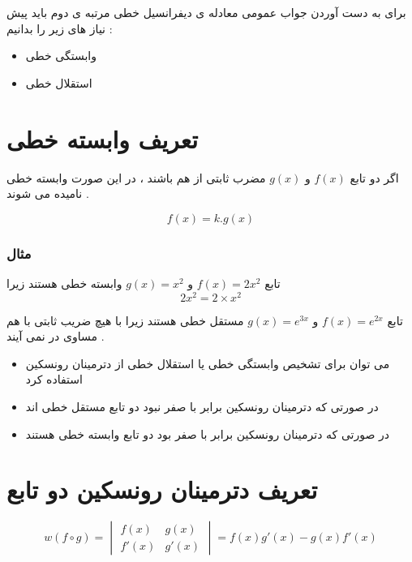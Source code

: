 \documentclass[12pt]{book}
\begin{document}
برای به دست آوردن جواب عمومی معادله ی دیفرانسیل خطی مرتبه ی دوم باید پیش نیاز های زیر را بدانیم :

\begin{itemize}
	\item وابستگی خطی
	\item استقلال خطی
\end{itemize}


\section{تعریف وابسته خطی}

اگر دو تابع 
$f(x)$
و
$g(x)$
مضرب ثابتی از هم باشند ، در این صورت وابسته خطی نامیده می شوند .

\begin{tcolorbox}
$$
f(x) = k . g(x)
$$
\end{tcolorbox}

\subsubsection{مثال}

تابع 
$f(x) = 2x^{2}$
و
$g(x)=x^{2}$
وابسته خطی هستند زیرا
$$
2x^{2} = 2 \times x^{2}
$$


تابع 
$f(x) = e^{2x}$
و
$g(x)=e^{3x}$
مستقل خطی هستند زیرا با هیچ ضریب ثابتی با هم مساوی در نمی آیند .

\begin{tcolorbox}
\begin{itemize}
	\item می توان برای تشخیص وابستگی خطی یا استقلال خطی از دترمینان رونسکین استفاده کرد
	\item در صورتی که دترمینان رونسکین برابر با صفر نبود دو تابع مستقل خطی اند
	\item در صورتی که دترمینان رونسکین برابر با صفر بود دو تابع وابسته خطی هستند 
\end{itemize}
\end{tcolorbox}


\section{تعریف دترمینان رونسکین دو تابع}


\begin{tcolorbox}
$$
w( f \circ g ) = \begin{vmatrix}
f(x) & g(x) \\
f'(x) & g'(x)
\end{vmatrix} = f(x)g'(x) - g(x)f'(x)
$$
\end{tcolorbox}
\end{document}
